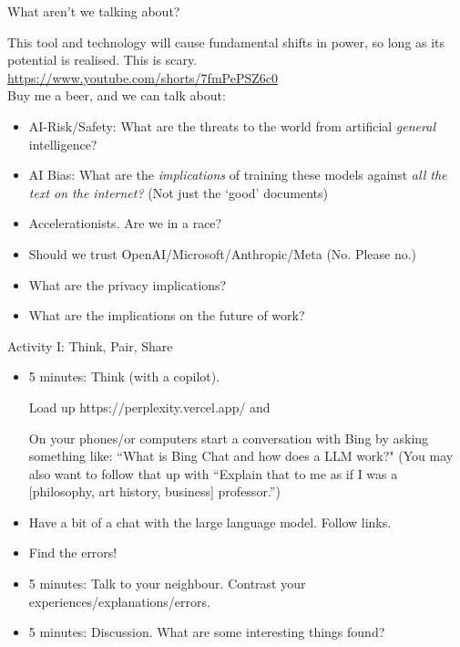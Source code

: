 \documentclass[aspectratio=169]{beamer}
\begin{document}
\begin{frame}{What aren't we talking about?}

This tool and technology will cause fundamental shifts in power, so long as its potential is realised. This is scary.\\[1em]

\url{https://www.youtube.com/shorts/7fmPePSZ6c0}\\[1em]

Buy me a beer, and we can talk about:

\begin{itemize}
    \item AI-Risk/Safety: What are the threats to the world from artificial \textit{general} intelligence?
    \item AI Bias: What are the \textit{implications} of training these models against \textit{all the text on the internet?} (Not just the `good' documents)
    \item Accelerationists. Are we in a race?
    \item Should we trust OpenAI/Microsoft/Anthropic/Meta (No. Please no.)
    \item What are the privacy implications?
    \item What are the implications on the future of work?
\end{itemize}
    
\end{frame}





\begin{frame}{Activity I: Think, Pair, Share}


\begin{itemize}
    \item 5 minutes: Think (with a copilot).

    Load up https://perplexity.vercel.app/ and 
    
    On your phones/or computers start a conversation with Bing by asking something like: ``What is Bing Chat and how does a LLM work?" (You may also want to follow that up with ``Explain that to me as if I was a [philosophy, art history, business] professor.'')    
    \item Have a bit of a chat with the large language model. Follow links.
    \item Find the errors!
    \item 5 minutes: Talk to your neighbour. Contrast your experiences/explanations/errors.
    \item 5 minutes: Discussion. What are some interesting things found?
\end{itemize}

\end{frame}
\end{document}
